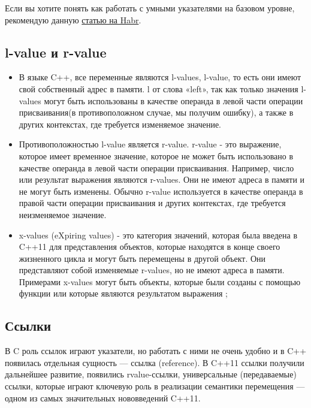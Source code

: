 Если вы хотите понять как работать с умными указателями на базовом уровне, рекомендую данную \href{https://habr.com/ru/companies/piter/articles/706866/}{статью на Habr}.

\subsection{l-value и r-value}

\begin{itemize}
    \item
          В языке C++, все переменные являются l-values, l-value, то есть они имеют свой собственный адрес в памяти. l от слова «left», так как только значения l-values могут быть использованы в качестве операнда в левой части операции присваивания(в противоположном случае, мы получим ошибку), а также в других контекстах, где требуется изменяемое значение.
    \item
          Противоположностью l-value является r-value. r-value - это выражение, которое имеет временное значение, которое не может быть использовано в качестве операнда в левой части операции присваивания. Например, число  или результат выражения  являются r-values. Они не имеют адреса в памяти и не могут быть изменены. Обычно r-value используется в качестве операнда в правой части операции присваивания и других контекстах, где требуется неизменяемое значение.
    \item
          x-values (eXpiring values) - это категория значений, которая была введена в C++11 для представления объектов, которые находятся в конце своего жизненного цикла и могут быть перемещены в другой объект. Они представляют собой изменяемые r-values, но не имеют адреса в памяти. Примерами x-values могут быть объекты, которые были созданы с помощью функции  или которые являются результатом выражения ;
\end{itemize}

\subsection{Ссылки}

В C роль ссылок играют указатели, но работать с ними не очень удобно и в C++ появилась отдельная сущность — ссылка (reference). В C++11 ссылки получили дальнейшее развитие, появились rvalue-ссылки, универсальные (передаваемые) ссылки, которые играют ключевую роль в реализации семантики перемещения — одном из самых значительных нововведений C++11.

